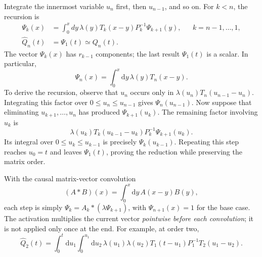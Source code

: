 \documentclass[11pt]{article}
\begin{document}
Integrate the innermost variable $u_n$ first, then $u_{n-1}$, and so on.
For $k<n$, the recursion is
\begin{equation}
    \boxed{\begin{aligned}
        \Psi_k(x)&=\int_0^x dy\,
            \lambda(y)T_k(x-y)P_k^{-1}\Psi_{k+1}(y),
            &&k=n-1,\ldots,1,\\
        \widehat Q_n(t)&=\Psi_1(t)\simeq Q_n(t).
    \end{aligned}}
    \label{eq:recursion}
\end{equation}
The vector $\Psi_k(x)$ has $r_{k-1}$ components; the last result
$\Psi_1(t)$ is a scalar. In particular,
\begin{equation}
    \Psi_n(x)=\int_0^x\!\mathrm{d}y\,\lambda(y)T_n(x-y).
\end{equation}
To derive the recursion, observe that $u_n$ occurs only in
$\lambda(u_n)T_n(u_{n-1}-u_n)$. Integrating this factor over
$0\leq u_n\leq u_{n-1}$ gives $\Psi_n(u_{n-1})$.
Now suppose that eliminating $u_{k+1},\ldots,u_n$ has produced
$\Psi_{k+1}(u_k)$. The remaining factor involving $u_k$ is
\begin{equation*}
    \lambda(u_k)T_k(u_{k-1}-u_k)P_k^{-1}\Psi_{k+1}(u_k).
\end{equation*}
Its integral over $0\leq u_k\leq u_{k-1}$ is precisely
$\Psi_k(u_{k-1})$. Repeating this step reaches $u_0=t$ and leaves
$\Psi_1(t)$, proving the reduction while preserving the matrix order.

With the causal matrix-vector convolution
\begin{equation}
    (A*B)(x)=\int_0^x\!\mathrm{d}y\,A(x-y)B(y),
\end{equation}
each step is simply $\Psi_k=A_k*(\lambda\Psi_{k+1})$,
with $\Psi_{n+1}(x)=1$ for the base case.
The activation multiplies the current vector \emph{pointwise before each
convolution}; it is not applied only once at the end.
For example, at order two,
\begin{equation}
    \widehat Q_2(t)=\int_0^t\!\mathrm{d}u_1\int_0^{u_1}\!\mathrm{d}u_2\,
       \lambda(u_1)\lambda(u_2)
       T_1(t-u_1)P_1^{-1}T_2(u_1-u_2).
\end{equation}
\end{document}
